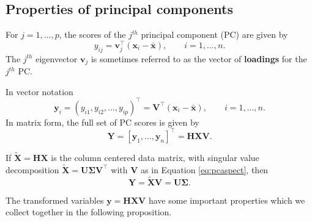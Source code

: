 \documentclass[]{book}
\theoremstyle{definition}
\theoremstyle{definition}
\theoremstyle{definition}
\theoremstyle{remark}
\begin{document}
\hypertarget{properties-of-principal-components}{%
\subsection{Properties of principal components}\label{properties-of-principal-components}}

For \(j=1, \ldots , p\), the scores of the \(j^{th}\) principal component (PC) are given by
\[
y_{ij}=\boldsymbol v_j^\top(\boldsymbol x_i - \bar{\boldsymbol x}), \qquad i=1, \ldots , n.
\]
The \(j^{th}\) eigenvector \(\boldsymbol v_j\) is sometimes referred to as the vector of \textbf{loadings} for the \(j^{th}\) PC.

In vector notation
\[
\boldsymbol y_i=( y_{i1}, y_{i2}, \ldots , y_{ip})^\top = \boldsymbol V^\top (\boldsymbol x_i -\bar{\boldsymbol x}), \qquad i=1, \ldots ,n.
\]
In matrix form, the full set of PC scores is given by
\[
\boldsymbol Y= [\boldsymbol y_1 , \ldots , \boldsymbol y_n]^\top =\boldsymbol H\boldsymbol X\boldsymbol V.
\]

If \(\tilde{\boldsymbol X}=\boldsymbol H\boldsymbol X\) is the column centered data matrix, with singular value decomposition
\(\tilde{\boldsymbol X}=\boldsymbol U\boldsymbol \Sigma\boldsymbol V^\top\) with \(\boldsymbol V\) as in Equation \eqref{eq:pcaspect}, then
\[\boldsymbol Y= \tilde{\boldsymbol X}\boldsymbol V= \boldsymbol U\boldsymbol \Sigma.\]

The transformed variables \(\boldsymbol y= \boldsymbol H\boldsymbol X\boldsymbol V\) have some important properties which we collect together in the following proposition.
\end{document}
